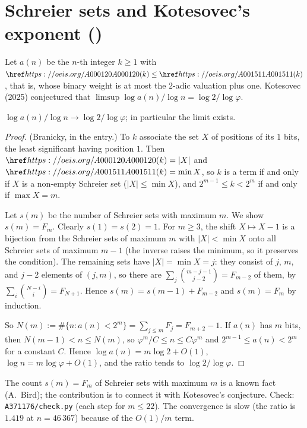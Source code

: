\section{Schreier sets and Kotesovec's exponent ()}\label{s:A371176}
Let $a(n)$ be the $n$-th integer $k\ge1$ with $\oeis{A000120}(k)\le\oeis{A001511}(k)$, that is, whose binary
weight is at most the $2$-adic valuation plus one. Kotesovec (2025) conjectured that
$\limsup\log a(n)/\log n=\log2/\log\varphi$.
\begin{theorem}\label{t:A371176} $\log a(n)/\log n\to\log2/\log\varphi$; in particular the limit exists.\end{theorem}
\begin{proof} (Branicky, in the entry.) To $k$ associate the set $X$ of positions of its $1$ bits, the least
significant having position $1$. Then $\oeis{A000120}(k)=|X|$ and $\oeis{A001511}(k)=\min X$, so $k$ is a term
if and only if $X$ is a non-empty Schreier set ($|X|\le\min X$), and $2^{m-1}\le k<2^m$ if and only if
$\max X=m$.

Let $s(m)$ be the number of Schreier sets with maximum $m$. We show $s(m)=F_m$. Clearly $s(1)=s(2)=1$. For
$m\ge3$, the shift $X\mapsto X-1$ is a bijection from the Schreier sets of maximum $m$ with $|X|<\min X$ onto
all Schreier sets of maximum $m-1$ (the inverse raises the minimum, so it preserves the condition). The
remaining sets have $|X|=\min X=j$: they consist of $j$, $m$, and $j-2$ elements of $(j,m)$, so there are
$\sum_j\binom{m-j-1}{j-2}=F_{m-2}$ of them, by $\sum_i\binom{N-i}{i}=F_{N+1}$. Hence $s(m)=s(m-1)+F_{m-2}$ and
$s(m)=F_m$ by induction.

So $N(m):=\#\{n:a(n)<2^m\}=\sum_{j\le m}F_j=F_{m+2}-1$. If $a(n)$ has $m$ bits, then $N(m-1)<n\le N(m)$, so
$\varphi^m/C\le n\le C\varphi^m$ and $2^{m-1}\le a(n)<2^m$ for a constant $C$. Hence $\log a(n)=m\log2+O(1)$,
$\log n=m\log\varphi+O(1)$, and the ratio tends to $\log2/\log\varphi$. \end{proof}
The count $s(m)=F_m$ of Schreier sets with maximum $m$ is a known fact (A.~Bird); the contribution is to
connect it with Kotesovec's conjecture. Check: \texttt{A371176/check.py} (each step for $m\le22$). The convergence is slow (the ratio is $1.419$ at
$n=46\,367$) because of the $O(1)/m$ term.


